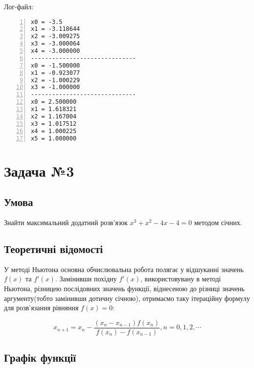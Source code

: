 \documentclass[a4paper, 12pt]{article}
\begin{document}
Лог-файл:

\begin{Verbatim}[numbers=left,xleftmargin=20mm]
x0 = -3.5
x1 = -3.118644
x2 = -3.009275
x3 = -3.000064
x4 = -3.000000
------------------------------
x0 = -1.500000
x1 = -0.923077
x2 = -1.000229
x3 = -1.000000
------------------------------
x0 = 2.500000
x1 = 1.618321
x2 = 1.167004
x3 = 1.017512
x4 = 1.000225
x5 = 1.000000
\end{Verbatim}

\newpage
\section{Задача №3}

\subsection{Умова}

Знайти максимальний додатний розв’язок $ x^3 + x^2 - 4x - 4 = 0 $ методом січних.

\subsection{Теоретичні відомості}

У методі Ньютона основна обчислювальна робота полягає у відшуканні значень $f(x)$ та $f'(x)$. Замінивши похідну $f'(x)$, використовувану в методі Ньютона, різницею послідовних значень функції, віднесеною до різниці значень аргументу(тобто замінивши дотичну січною), отримаємо таку ітераційну формулу для розв'язання рівняння $f(x) = 0$:

\[ x_{n+1} = x_n - \frac{(x_n-x_{n-1})f(x_n)}{f(x_n)-f(x_{n-1})}, n = 0, 1, 2, \cdots \]

\subsection{Графік функції}

\end{document}
